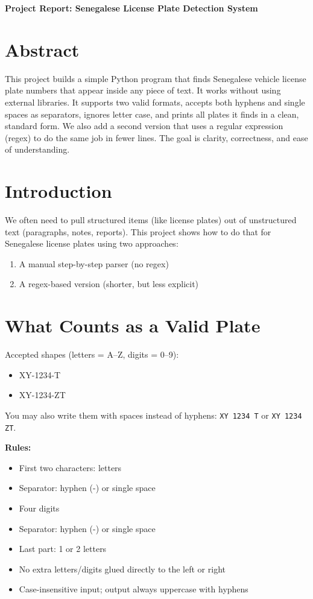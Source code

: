 \documentclass[12pt,a4paper]{article}
\begin{document}
\begin{center}
    \Large \textbf{Project Report: Senegalese License Plate Detection System}
\end{center}
\section*{Abstract}
This project builds a simple Python program that finds Senegalese vehicle license plate numbers that appear inside any piece of text. It works without using external libraries. It supports two valid formats, accepts both hyphens and single spaces as separators, ignores letter case, and prints all plates it finds in a clean, standard form. We also add a second version that uses a regular expression (regex) to do the same job in fewer lines. The goal is clarity, correctness, and ease of understanding.
\section{Introduction}
We often need to pull structured items (like license plates) out of unstructured text (paragraphs, notes, reports). This project shows how to do that for Senegalese license plates using two approaches:
\begin{enumerate}
    \item A manual step-by-step parser (no regex)
    \item A regex-based version (shorter, but less explicit)
\end{enumerate}
\section{What Counts as a Valid Plate}
Accepted shapes (letters = A–Z, digits = 0–9):
\begin{itemize}
    \item XY-1234-T
    \item XY-1234-ZT
\end{itemize}

\noindent You may also write them with spaces instead of hyphens: \texttt{XY 1234 T} or \texttt{XY 1234 ZT}.
\vspace{6pt}

\noindent \textbf{Rules:}
\begin{itemize}
    \item First two characters: letters
    \item Separator: hyphen (-) or single space
    \item Four digits
    \item Separator: hyphen (-) or single space
    \item Last part: 1 or 2 letters
    \item No extra letters/digits glued directly to the left or right
    \item Case-insensitive input; output always uppercase with hyphens
\end{itemize}
\end{document}
